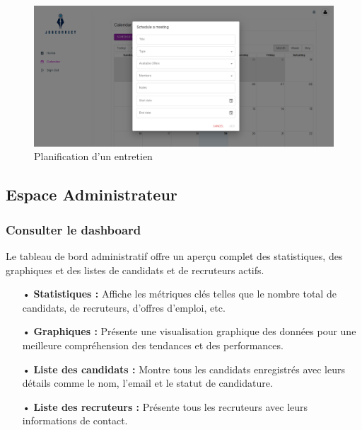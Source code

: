 \begin{figure}[htbp]
   \centering
   \includegraphics[scale=0.18]{screens/schedule.png} 
   \caption{Planification d'un entretien}
   \label{fig:scheduleIcon}
\end{figure}

\subsection{Espace Administrateur}

\subsubsection{Consulter le dashboard}

Le tableau de bord administratif offre un aperçu complet des statistiques, des graphiques et des listes de candidats et de recruteurs actifs.

\begin{itemize}
    \item[•] \textbf{Statistiques :} Affiche les métriques clés telles que le nombre total de candidats, de recruteurs, d'offres d'emploi, etc.
    \item[•] \textbf{Graphiques :} Présente une visualisation graphique des données pour une meilleure compréhension des tendances et des performances.
    \item[•] \textbf{Liste des candidats :} Montre tous les candidats enregistrés avec leurs détails comme le nom, l'email et le statut de candidature.
    \item[•] \textbf{Liste des recruteurs :} Présente tous les recruteurs avec leurs informations de contact.
\end{itemize}

